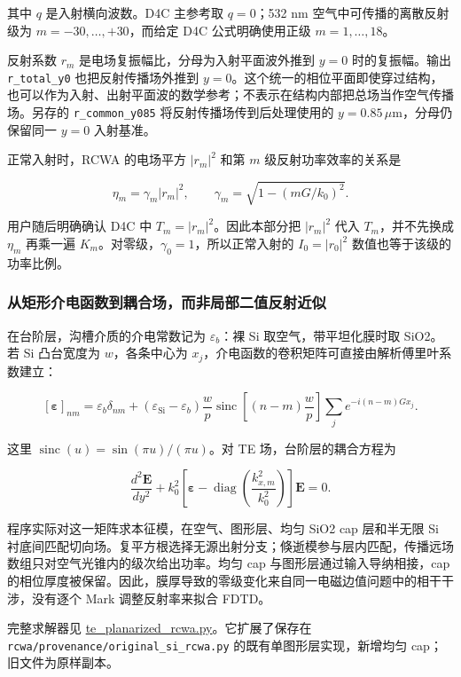 \documentclass[
  chinese,
  UTF8,
  a4paper,
  11pt]{ctexart}
\begin{document}
其中 \(q\) 是入射横向波数。D4C 主参考取 \(q=0\)；532 nm
空气中可传播的离散反射级为 \(m=-30,\ldots,+30\)，而给定 D4C
公式明确使用正级 \(m=1,\ldots,18\)。

反射系数 \(r_m\) 是电场复振幅比，分母为入射平面波外推到 \(y=0\)
时的复振幅。输出 \texttt{r\_total\_y0} 也把反射传播场外推到
\(y=0\)。这个统一的相位平面即使穿过结构，也可以作为入射、出射平面波的数学参考；不表示在结构内部把总场当作空气传播场。另存的
\texttt{r\_common\_y085} 将反射传播场传到后处理使用的
\(y=0.85\,\mu\mathrm m\)，分母仍保留同一 \(y=0\) 入射基准。

正常入射时，RCWA 的电场平方 \(|r_m|^2\) 和第 \(m\)
级反射功率效率的关系是

\[
\eta_m=\gamma_m|r_m|^2,\qquad
\gamma_m=\sqrt{1-(mG/k_0)^2}.
\]

用户随后明确确认 D4C 中 \(T_m=|r_m|^2\)。因此本部分把 \(|r_m|^2\) 代入
\(T_m\)，并不先换成 \(\eta_m\) 再乘一遍
\(K_m\)。对零级，\(\gamma_0=1\)，所以正常入射的 \(I_0=|r_0|^2\)
数值也等于该级的功率比例。

\subsubsection{从矩形介电函数到耦合场，而非局部二值反射近似}\label{ux4eceux77e9ux5f62ux4ecbux7535ux51fdux6570ux5230ux8026ux5408ux573aux800cux975eux5c40ux90e8ux4e8cux503cux53cdux5c04ux8fd1ux4f3c}

在台阶层，沟槽介质的介电常数记为 \(\varepsilon_b\)：裸 Si
取空气，带平坦化膜时取 SiO2。若 Si 凸台宽度为 \(w\)，各条中心为
\(x_j\)，介电函数的卷积矩阵可直接由解析傅里叶系数建立：

\[
[\boldsymbol\varepsilon]_{nm}
=\varepsilon_b\delta_{nm}
+(\varepsilon_{\mathrm{Si}}-\varepsilon_b)
\frac wp\operatorname{sinc}\left[(n-m)\frac wp\right]
\sum_j e^{-i(n-m)Gx_j}.
\]

这里 \(\operatorname{sinc}(u)=\sin(\pi u)/(\pi u)\)。对 TE
场，台阶层的耦合方程为

\[
\frac{d^2\mathbf E}{dy^2}
+k_0^2\left[\boldsymbol\varepsilon-
\operatorname{diag}\left(\frac{k_{x,m}^2}{k_0^2}\right)\right]\mathbf E=0.
\]

程序实际对这一矩阵求本征模，在空气、图形层、均匀 SiO2 cap 层和半无限 Si
衬底间匹配切向场。复平方根选择无源出射分支；倏逝模参与层内匹配，传播远场数组只对空气光锥内的级次给出功率。均匀
cap 与图形层通过输入导纳相接，cap
的相位厚度被保留。因此，膜厚导致的零级变化来自同一电磁边值问题中的相干干涉，没有逐个
Mark 调整反射率来拟合 FDTD。

完整求解器见
\href{../rcwa/te_planarized_rcwa.py}{te\_planarized\_rcwa.py}。它扩展了保存在
\texttt{rcwa/provenance/original\_si\_rcwa.py}
的既有单图形层实现，新增均匀 cap；旧文件为原样副本。
\end{document}
